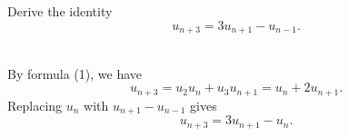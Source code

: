 \begin{exercise}
    Derive the identity
    $$u_{n+3} = 3u_{n+1} - u_{n-1}.$$
    \\
\end{exercise}

\begin{solution}
    By formula (1), we have 
    $$u_{n+3} = u_2u_n + u_3u_{n+1} = u_n + 2u_{n+1}.$$
    Replacing $u_n$ with $u_{n+1} - u_{n-1}$ gives
    $$u_{n+3} = 3u_{n+1} - u_n.$$
\end{solution}